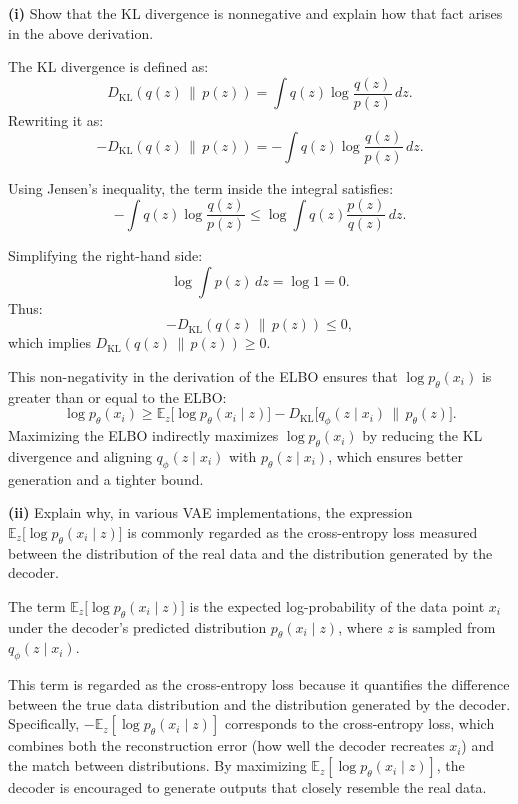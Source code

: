 \textbf{(i)} Show that the KL divergence is nonnegative and explain how that fact arises in the above derivation.
\begin{qsolve}
    \begin{qsolve}[]
        The KL divergence is defined as:
        \[
        D_{\mathrm{KL}}(q(z) \,\|\, p(z)) = \int q(z) \log \frac{q(z)}{p(z)} \, dz.
        \]
        Rewriting it as:
        \[
        -D_{\mathrm{KL}}(q(z) \,\|\, p(z)) = -\int q(z) \log \frac{q(z)}{p(z)} \, dz.
        \]

        Using Jensen's inequality, the term inside the integral satisfies:
        \[
        -\int q(z) \log \frac{q(z)}{p(z)} \leq \log \int q(z) \frac{p(z)}{q(z)} \, dz.
        \]
        
        Simplifying the right-hand side:
        \[
        \log \int p(z) \, dz = \log 1 = 0.
        \]
        \splitqsolve[\splitqsolve]
        Thus:
        \[
        -D_{\mathrm{KL}}(q(z) \,\|\, p(z)) \leq 0,
        \]
        which implies \(D_{\mathrm{KL}}(q(z) \,\|\, p(z)) \geq 0\).
        
        This non-negativity in the derivation of the ELBO ensures that \(\log p_{\theta}(x_i)\) is greater than or equal to the ELBO:
        \[
        \log p_{\theta}(x_i) \geq \mathbb{E}_{z}\bigl[\log p_{\theta}(x_i \mid z)\bigr] - D_{\mathrm{KL}}\bigl[q_{\phi}(z \mid x_i) \,\|\, p_{\theta}(z)\bigr].
        \]
        Maximizing the ELBO indirectly maximizes \(\log p_{\theta}(x_i)\) by reducing the KL divergence and aligning \(q_{\phi}(z \mid x_i)\) with \(p_{\theta}(z \mid x_i)\), which ensures better generation and a tighter bound.
    \end{qsolve}
\end{qsolve}
\textbf{(ii)} Explain why, in various VAE implementations, the expression 
\(\mathbb{E}_{z}\bigl[\log p_{\theta}(x_i \mid z)\bigr]\) is commonly regarded as the cross-entropy loss measured between the distribution of the real data and the distribution generated by the decoder.
\begin{qsolve}
    \begin{qsolve}[]
        The term \(\mathbb{E}_{z}\bigl[\log p_{\theta}(x_i \mid z)\bigr]\) is the expected log-probability of the data point \(x_i\) under the decoder’s predicted distribution \(p_{\theta}(x_i \mid z)\), where \(z\) is sampled from \(q_{\phi}(z \mid x_i)\).

        This term is regarded as the cross-entropy loss because it quantifies the difference between the true data distribution and the distribution generated by the decoder. Specifically, \(-\mathbb{E}_{z}[\log p_{\theta}(x_i \mid z)]\) corresponds to the cross-entropy loss, which combines both the reconstruction error (how well the decoder recreates \(x_i\)) and the match between distributions. By maximizing \(\mathbb{E}_{z}[\log p_{\theta}(x_i \mid z)]\), the decoder is encouraged to generate outputs that closely resemble the real data.
    \end{qsolve}
\end{qsolve}
